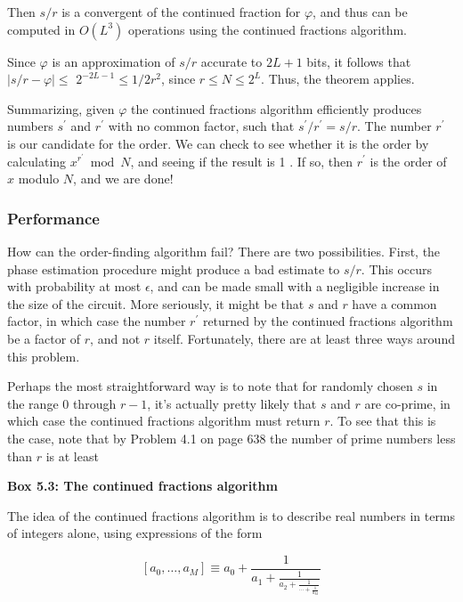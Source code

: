 Then $s / r$ is a convergent of the continued fraction for $\varphi$, and thus can be computed in $O\left(L^{3}\right)$ operations using the continued fractions algorithm.

Since $\varphi$ is an approximation of $s / r$ accurate to $2 L+1$ bits, it follows that $|s / r-\varphi| \leq$ $2^{-2 L-1} \leq 1 / 2 r^{2}$, since $r \leq N \leq 2^{L}$. Thus, the theorem applies.

Summarizing, given $\varphi$ the continued fractions algorithm efficiently produces numbers $s^{\prime}$ and $r^{\prime}$ with no common factor, such that $s^{\prime} / r^{\prime}=s / r$. The number $r^{\prime}$ is our candidate for the order. We can check to see whether it is the order by calculating $x^{r^{\prime}} \bmod N$, and seeing if the result is 1 . If so, then $r^{\prime}$ is the order of $x$ modulo $N$, and we are done!

\subsubsection{Performance}
How can the order-finding algorithm fail? There are two possibilities. First, the phase estimation procedure might produce a bad estimate to $s / r$. This occurs with probability at most $\epsilon$, and can be made small with a negligible increase in the size of the circuit. More seriously, it might be that $s$ and $r$ have a common factor, in which case the number $r^{\prime}$ returned by the continued fractions algorithm be a factor of $r$, and not $r$ itself. Fortunately, there are at least three ways around this problem.

Perhaps the most straightforward way is to note that for randomly chosen $s$ in the range 0 through $r-1$, it's actually pretty likely that $s$ and $r$ are co-prime, in which case the continued fractions algorithm must return $r$. To see that this is the case, note that by Problem 4.1 on page 638 the number of prime numbers less than $r$ is at least

\textbf{Box 5.3: The continued fractions algorithm}

The idea of the continued fractions algorithm is to describe real numbers in terms of integers alone, using expressions of the form

\begin{equation}
    \left[a_{0}, \ldots, a_{M}\right] \equiv a_{0}+\frac{1}{a_{1}+\frac{1}{a_{2}+\frac{1}{\cdots+\frac{1}{a_{M}}}}} \tag{5.49}
\end{equation}

